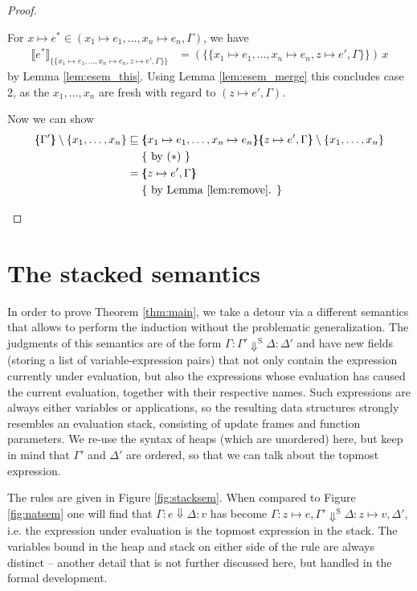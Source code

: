\documentclass{jfp1}
\theoremstyle{nonumberbreak}
\newtheorem{proof}{Proof}
\newcommand{\sred}[4]{#1 : #2 \Downarrow #3 : #4}
\newcommand{\ssred}[4]{#1 : #2 \Downarrow^{\textrm{S}} #3 : #4}
\newcommand{\xen}{x_1\mapsto e_1, \ldots, x_n\mapsto e_n}
\newcommand{\dsem}[2]{\llbracket #1 \rrbracket_{#2}}
\newcommand{\esem}[1]{\{\!\!\!\{#1\}\!\!\!\}}
\newcommand{\aexpl}[1]{&\mathrel{\phantom{=}}\left\{\text{ #1 }\right\}}
\begin{document}
\begin{proof}
\begin{compactitem}[$\sqsubseteq$:]
\begin{compactenum}
\item For $x \mapsto e^* \in (\xen, \Gamma)$, we have
\begin{align*}
\dsem{e^*}{\esem{\xen, z \mapsto e', \Gamma}}
&= (\esem{\xen, z \mapsto e', \Gamma})\, x
\end{align*}
by Lemma \ref{lem:esem_this}. Using Lemma \ref{lem:esem_merge} this concludes case 2, as the $x_1,\ldots,x_n$ are fresh with regard to $(z\mapsto e', \Gamma)$.
\end{compactenum}

Now we can show
\begin{align*}
\esem{\Gamma'} \setminus \{x_1,\ldots,x_n\}
&\sqsubseteq  \esem{\xen}{\esem{z \mapsto e', \Gamma}}  \setminus \{x_1,\ldots,x_n\} \\
\aexpl{by ($\ast$)} \\
& = {\esem{z \mapsto e', \Gamma}} \\
\aexpl{by Lemma \ref{lem:remove}.}
\end{align*}
\end{compactitem}

\end{proof}


\section{The stacked semantics}
\label{stackedsemantics}

In order to prove Theorem \ref{thm:main}, we take a detour via a different semantics that allows to perform the induction without the problematic generalization. The judgments of this semantics are of the form $\ssred \Gamma {\Gamma'} \Delta {\Delta'}$ and have new fields (storing a list of variable-expression pairs) that not only contain the expression currently under evaluation, but also the expressions whose evaluation has caused the current evaluation, together with their respective names. Such expressions are always either variables or applications, so the resulting data structures strongly resembles an evaluation stack, consisting of update frames and function parameters. We re-use the syntax of heaps (which are unordered) here, but keep in mind that $\Gamma'$ and $\Delta'$ are ordered, so that we can talk about the topmost expression.

The rules are given in Figure \ref{fig:stacksem}. When compared to Figure \ref{fig:natsem} one will find that $\sred{\Gamma}e{\Delta}v$ has become $\ssred{\Gamma}{z \mapsto e, \Gamma'}{\Delta}{z \mapsto v, \Delta'}$, i.e. the expression under evaluation is the topmost expression in the stack. The variables bound in the heap and stack on either side of the rule are always distinct -- another detail that is not further discussed here, but handled in the formal development.
\end{document}
